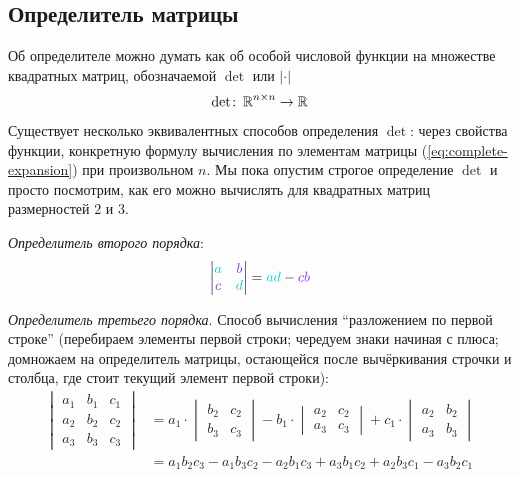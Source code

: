 \documentclass[a4paper,12pt]{article}
\begin{document}
  \subsection{Определитель матрицы}
  
  Об определителе можно думать как об особой числовой функции на множестве квадратных матриц, обозначаемой $\det$ или $|\cdot|$
  \[
    \det \colon \operatorname{\mathbb R}^{n\times n} \to \operatorname{\mathbb R}
  \]
  Существует несколько эквивалентных способов определения $\det$: через свойства функции, конкретную формулу вычисления по элементам матрицы (\ref{eq:complete-expansion}) при произвольном $n$.
  Мы пока опустим строгое определение $\det$ и просто посмотрим, как его можно вычислять для квадратных матриц размерностей $2$ и $3$.
  
  \emph{Определитель второго порядка}:
  \[
    \begin{vmatrix}
      \textcolor{light-cyan}{a}   & \textcolor{light-purple}{b} \\
      \textcolor{light-purple}{c} & \textcolor{light-cyan}{d} 
    \end{vmatrix} = \textcolor{light-cyan}{a} \textcolor{light-cyan}{d}  - \textcolor{light-purple}{c} \textcolor{light-purple}{b}
  \]

  \emph{Определитель третьего порядка}.
  Способ вычисления ``разложением по первой строке'' (перебираем элементы первой строки; чередуем знаки начиная с плюса; домножаем на определитель матрицы, остающейся после вычёркивания строчки и столбца, где стоит текущий элемент первой строки):
  \begin{equation}
  \label{eq:third-order-det-fy-first-line}
  \begin{split}
    \begin{vmatrix}
      a_1 & b_1 & c_1\\
      a_2 & b_2 & c_2\\
      a_3 & b_3 & c_3
    \end{vmatrix} &=
      a_1 \cdot \begin{vmatrix}b_2 & c_2\\b_3 & c_3\end{vmatrix}
      - b_1 \cdot \begin{vmatrix}a_2 & c_2\\a_3 & c_3\end{vmatrix}
      + c_1 \cdot \begin{vmatrix}a_2 & b_2\\a_3 & b_3\end{vmatrix}\\
      &=a_1 b_2 c_3 - a_1 b_3 c_2 - a_2 b_1 c_3 + a_3 b_1 c_2 + a_2 b_3 c_1 - a_3 b_2 c_1
  \end{split}
  \end{equation}
  
\end{document}
